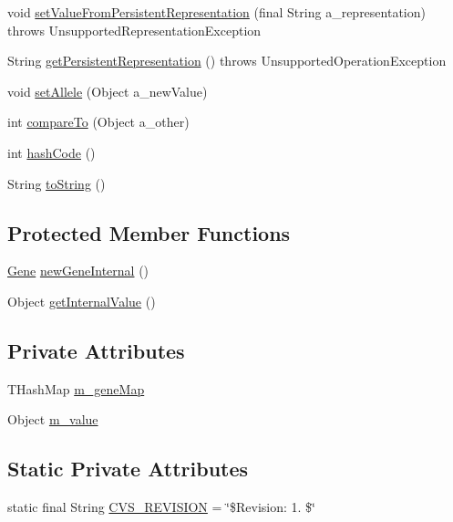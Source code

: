 \begin{DoxyCompactItemize}
void \hyperlink{classorg_1_1jgap_1_1impl_1_1_map_gene_aa26832d5aefa69e44d2efd58e333e230}{set\-Value\-From\-Persistent\-Representation} (final String a\-\_\-representation)  throws Unsupported\-Representation\-Exception 
\item 
String \hyperlink{classorg_1_1jgap_1_1impl_1_1_map_gene_a0a1b56bd574314d61311ac070f7f9845}{get\-Persistent\-Representation} ()  throws Unsupported\-Operation\-Exception 
\item 
void \hyperlink{classorg_1_1jgap_1_1impl_1_1_map_gene_af102ddb4e963fc1355ea193ce414ca54}{set\-Allele} (Object a\-\_\-new\-Value)
\item 
int \hyperlink{classorg_1_1jgap_1_1impl_1_1_map_gene_a32fbf53138c5ea70f07490684f9fc659}{compare\-To} (Object a\-\_\-other)
\item 
int \hyperlink{classorg_1_1jgap_1_1impl_1_1_map_gene_ae79496d829629130032c7ba5b25af355}{hash\-Code} ()
\item 
String \hyperlink{classorg_1_1jgap_1_1impl_1_1_map_gene_a4b9c5182f259a969cef430fa1d66d17f}{to\-String} ()
\end{DoxyCompactItemize}
\subsection*{Protected Member Functions}
\begin{DoxyCompactItemize}
\item 
\hyperlink{interfaceorg_1_1jgap_1_1_gene}{Gene} \hyperlink{classorg_1_1jgap_1_1impl_1_1_map_gene_aea5223852eb46cf96ffb04b4b16165b7}{new\-Gene\-Internal} ()
\item 
Object \hyperlink{classorg_1_1jgap_1_1impl_1_1_map_gene_a20a2cdecf740152ac3454df33e0d8449}{get\-Internal\-Value} ()
\end{DoxyCompactItemize}
\subsection*{Private Attributes}
\begin{DoxyCompactItemize}
\item 
T\-Hash\-Map \hyperlink{classorg_1_1jgap_1_1impl_1_1_map_gene_a01e13b3562f441aa9be32547a0d462c8}{m\-\_\-gene\-Map}
\item 
Object \hyperlink{classorg_1_1jgap_1_1impl_1_1_map_gene_a22a2a9132722ecd9188dffc593722df0}{m\-\_\-value}
\end{DoxyCompactItemize}
\subsection*{Static Private Attributes}
\begin{DoxyCompactItemize}
\item 
static final String \hyperlink{classorg_1_1jgap_1_1impl_1_1_map_gene_aa65a07ab87910fd23ef486d0bd4340d6}{C\-V\-S\-\_\-\-R\-E\-V\-I\-S\-I\-O\-N} = \char`\"{}\$Revision\-: 1. \$\char`\"{}
\end{DoxyCompactItemize}

